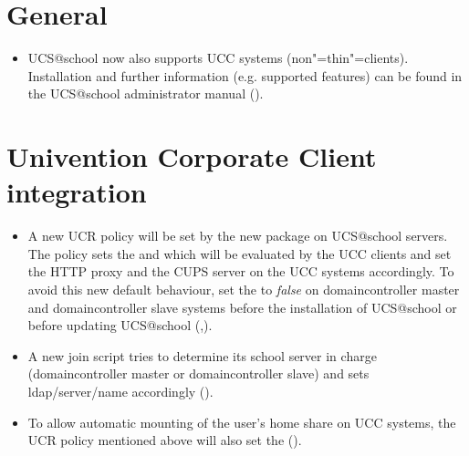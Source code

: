 \section{General}
\begin{itemize}
\item UCS@school now also supports UCC systems (non"=thin"=clients). Installation and further information
  (e.g. supported features) can be found in the UCS@school administrator manual ().
\end{itemize}

\section{Univention Corporate Client integration}
\begin{itemize}
\item A new UCR policy will be set by the new package  on UCS@school
  servers. The policy sets the  and  which will be
  evaluated by the UCC clients and set the HTTP proxy and the CUPS server on the UCC systems accordingly. 
  To avoid this new default behaviour, set the
   to \emph{false} on domaincontroller master
  and domaincontroller slave systems before the installation of UCS@school or before updating UCS@school
  (,).
\item A new join script tries to determine its school server in charge (domaincontroller master or domaincontroller
  slave) and sets ldap/server/name accordingly ().
\item To allow automatic mounting of the user's home share on UCC systems, the UCR policy mentioned above will also set the
   ().
\end{itemize}

 


